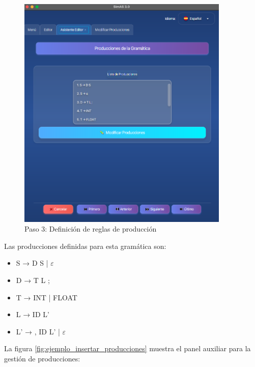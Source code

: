\needspace{8cm}
\begin{figure}[H]
    \centering
    \includegraphics[width=0.9\textwidth]{figuras/ejemplo_practico/editor_paso3.png}
    \caption{Paso 3: Definición de reglas de producción}
    \label{fig:ejemplo_editor_paso3}
\end{figure}

Las producciones definidas para esta gramática son:
\begin{itemize}
    \item S → D S | $\varepsilon$
    \item D → T L ;
    \item T → INT | FLOAT
    \item L → ID L'
    \item L' → , ID L' | $\varepsilon$
\end{itemize}

La figura \ref{fig:ejemplo_insertar_producciones} muestra el panel auxiliar para la gestión de producciones:


